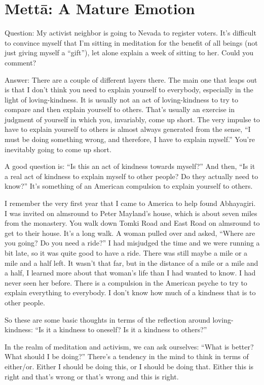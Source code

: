 \chapter{Mettā: A Mature Emotion}

\qaspace
Question: My activist neighbor is going to Nevada to register voters.
It’s difficult to convince myself that I’m sitting in meditation for the
benefit of all beings (not just giving myself a “gift”), let alone
explain a week of sitting to her. Could you comment?

\qaspace
Answer: There are a couple of different layers there. The main one that
leaps out is that I don’t think you need to explain yourself to
everybody, especially in the light of loving-kindness. It is usually not
an act of loving-kindness to try to compare and then explain yourself to
others. That’s usually an exercise in judgment of yourself in which you,
invariably, come up short. The very impulse to have to explain yourself
to others is almost always generated from the sense, “I must be doing
something wrong, and therefore, I have to explain myself.” You’re
inevitably going to come up short.

A good question is: “Is this an act of kindness towards myself?” And
then, “Is it a real act of kindness to explain myself to other people?
Do they actually need to know?” It’s something of an American compulsion
to explain yourself to others.

I remember the very first year that I came to America to help found
Abhayagiri. I was invited on almsround to Peter Mayland’s house, which
is about seven miles from the monastery. You walk down Tomki Road and
East Road on almsround to get to their house. It’s a long walk. A woman
pulled over and asked, “Where are you going? Do you need a ride?” I had
misjudged the time and we were running a bit late, so it was quite good
to have a ride. There was still maybe a mile or a mile and a half left.
It wasn’t that far, but in the distance of a mile or a mile and a half,
I learned more about that woman’s life than I had wanted to know. I had
never seen her before. There is a compulsion in the American psyche to
try to explain everything to everybody. I don’t know how much of a
kindness that is to other people.

So these are some basic thoughts in terms of the reflection around
loving-kindness: “Is it a kindness to oneself? Is it a kindness to
others?”

In the realm of meditation and activism, we can ask ourselves: “What is
better? What should I be doing?” There’s a tendency in the mind to think
in terms of either/or. Either I should be doing this, or I should be
doing that. Either this is right and that’s wrong or that’s wrong and
this is right.

